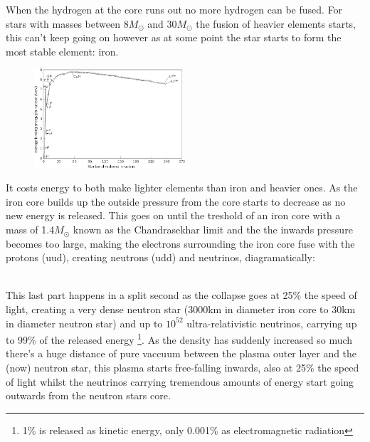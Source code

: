 \documentclass[11pt,a4paper,faculty=we,language=en,doctype=report]{cls/ugent-doc}
\begin{document}
When the hydrogen at the core runs out no more hydrogen can be fused. For
stars with masses between $8M_\odot$ and $30M_\odot$ the
fusion of heavier elements starts, this can't keep going on however as at some
point the star starts to form the most stable element: iron. 
\begin{figure}[!ht]
	\centering
	\includegraphics[width=0.5\textwidth]{Binding_energy_curve.png}
\end{figure}
It costs energy
to both make lighter elements than iron and heavier ones.  As the iron core
builds up the outside pressure from the core starts to decrease as no new
energy is released. This goes on until  the treshold of an iron core with a mass of 1.4$M_\odot$ known as the 
Chandrasekhar limit and the the inwards pressure becomes too large, making the
electrons surrounding the iron core fuse with the protons (uud),  creating
neutrons (udd) and neutrinos, diagramatically:
\begin{figure}[!ht]
	\centering
\end{figure}\\
This last part happens in a split second as the collapse goes at 25\% the speed
of light, creating a very dense neutron star (3000km in diameter iron core to
30km in diameter neutron star) and up to $10^{52}$ ultra-relativistic
neutrinos, carrying up to 99\% of the released energy
\cite{Melson_2015}\footnote{1\% is released as kinetic energy, only 0.001\% as
electromagnetic radiation}.  As the density has suddenly increased so much
there's a huge distance of pure vaccuum between the plasma outer layer and the
(now) neutron star, this plasma starts free-falling inwards, also at 25\% the
speed of light whilst the neutrinos carrying tremendous amounts of energy start
going outwards from the neutron stars core.
\end{document}
